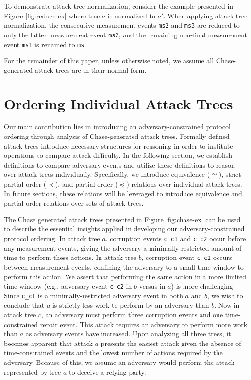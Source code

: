 \documentclass[runningheads]{llncs}
\theoremstyle{definition}
\begin{document}
\noindent To demonstrate attack tree normalization, consider the example presented in Figure \ref{fig:reduce-ex} where tree $a$ is normalized to $a'$. When applying attack tree normalization, the consecutive measurement events \texttt{ms2} and \texttt{ms3} are reduced to only the latter measurement event \texttt{ms2}, and the remaining non-final measurement event \texttt{ms1} is renamed to \texttt{ms}.

For the remainder of this paper, unless otherwise noted, we assume all Chase-generated attack trees are in their normal form.


\section{Ordering Individual Attack Trees}

Our main contribution lies in introducing an adversary-constrained protocol ordering through analysis of Chase-generated attack trees. Formally defined attack trees introduce necessary structures for reasoning in order to institute operations to compare attack difficulty. In the following section, we establish definitions to compare adversary events and utilize these definitions to reason over attack trees individually. Specifically, we introduce equivalence ($\simeq$), strict partial order ($\prec$), and partial order ($\preceq$) relations over individual attack trees. In future sections, these relations will be leveraged to introduce equivalence and partial order relations over sets of attack trees.

The Chase generated attack trees presented in Figure \ref{fig:chase-ex} can be used to describe the essential insights applied in developing our adversary-constrained protocol ordering. In attack tree $a$, corruption events \texttt{c\_c1} and \texttt{c\_c2} occur before any measurement events, giving the adversary a minimally-restricted amount of time to perform these actions. In attack tree $b$, corruption event \texttt{c\_c2} occurs between measurement events, confining the adversary to a small-time window to perform this action. We assert that performing the same action in a more limited time window (e.g., adversary event \texttt{c\_c2} in $b$ versus in $a$) is more challenging. Since \texttt{c\_c1} is a minimally-restricted adversary event in both $a$ and $b$, we wish to conclude that $a$ is strictly less work to perform by an adversary than $b$. Now in attack tree $c$, an adversary must perform three corruption events and one time-constrained repair event. This attack requires an adversary to perform more work than $a$ as adversary events have increased. Upon analyzing all three trees, it becomes apparent that attack $a$ presents the easiest attack given the absence of time-constrained events and the lowest number of actions required by the adversary. Because of this, we assume an adversary would perform the attack represented by tree $a$ to deceive a relying party. 
\end{document}
